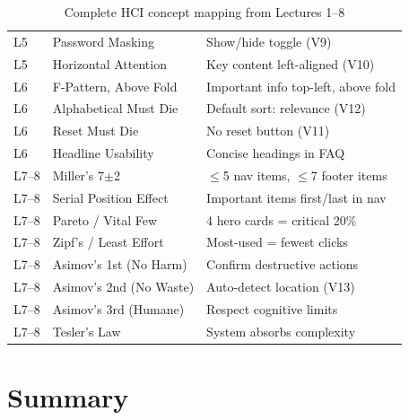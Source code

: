 \documentclass[12pt, a4paper]{article}
\begin{document}
\begin{table}[H]
\begin{tabularx}{\textwidth}{|l|l|X|}
\hline
L5 & Password Masking & Show/hide toggle (V9) \\
L5 & Horizontal Attention & Key content left-aligned (V10) \\
\hline
L6 & F-Pattern, Above Fold & Important info top-left, above fold \\
L6 & Alphabetical Must Die & Default sort: relevance (V12) \\
L6 & Reset Must Die & No reset button (V11) \\
L6 & Headline Usability & Concise headings in FAQ \\
\hline
L7--8 & Miller's 7$\pm$2 & $\leq$5 nav items, $\leq$7 footer items \\
L7--8 & Serial Position Effect & Important items first/last in nav \\
L7--8 & Pareto / Vital Few & 4 hero cards = critical 20\% \\
L7--8 & Zipf's / Least Effort & Most-used = fewest clicks \\
L7--8 & Asimov's 1st (No Harm) & Confirm destructive actions \\
L7--8 & Asimov's 2nd (No Waste) & Auto-detect location (V13) \\
L7--8 & Asimov's 3rd (Humane) & Respect cognitive limits \\
L7--8 & Tesler's Law & System absorbs complexity \\
\hline
\end{tabularx}
\caption{Complete HCI concept mapping from Lectures 1--8}
\end{table}

\newpage

\section{Summary}
\end{document}
